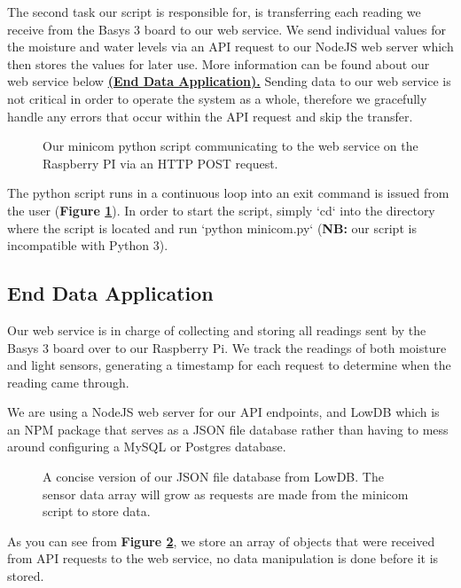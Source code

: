\documentclass[a4paper]{article}
\begin{document}
The second task our script is responsible for, is transferring each reading we receive from the Basys 3 board to our web service. We send individual values for the moisture and water levels via an API request to our NodeJS web server which then stores the values for later use. More information can be found about our web service below \hyperref[sec:enddata]{\textbf{(End Data Application).}} Sending data to our web service is not critical in order to operate the system as a whole, therefore we gracefully handle any errors that occur within the API request and skip the transfer.

\begin{figure}
  \caption{Our minicom python script communicating to the web service on the Raspberry PI via an HTTP POST request.}
  \label{fig:2}
\end{figure}

The python script runs in a continuous loop into an exit command is issued from the user (\textbf{Figure \ref{fig:2}}). In order to start the script, simply `cd` into the directory where the script is located and run `python minicom.py` (\textbf{NB:} our script is incompatible with Python 3).


\subsection{End Data Application}
\label{sec:enddata}

Our web service is in charge of collecting and storing all readings sent by the Basys 3 board over to our Raspberry Pi. We track the readings of both moisture and light sensors, generating a timestamp for each request to determine when the reading came through.

We are using a NodeJS \cite{nodejs} web server for our API endpoints, and LowDB \cite{lowdb} which is an NPM package that serves as a JSON file database rather than having to mess around configuring a MySQL or Postgres database.

\begin{figure}
  \caption{A concise version of our JSON file database from LowDB. The sensor data array will grow as requests are made from the minicom script to store data.}
  \label{fig:3}
\end{figure}

As you can see from \textbf{Figure \ref{fig:3}}, we store an array of objects that were received from API requests to the web service, no data manipulation is done before it is stored.
\end{document}
